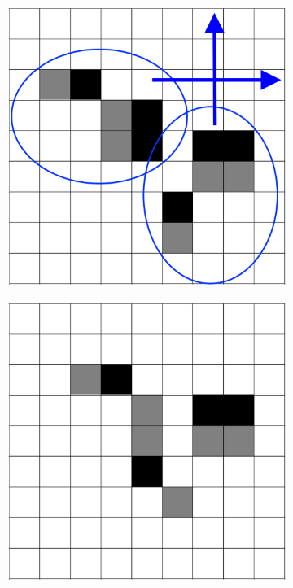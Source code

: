 \documentclass[12pt]{article}
\numberwithin{figure}{section} %
\begin{document}
\begin{figure}[H]
	\begin{subfigure}{0.24\textwidth}
     		\centering
     		\includegraphics[width=\linewidth]{Section4/32.0.png}
     		\subcaption{}
   	\end{subfigure}
    	\begin{subfigure}{0.24\textwidth}
     		\centering
     		\includegraphics[width=\linewidth]{Section4/32.1}

\end{subfigure}
\end{figure}
\end{document}
